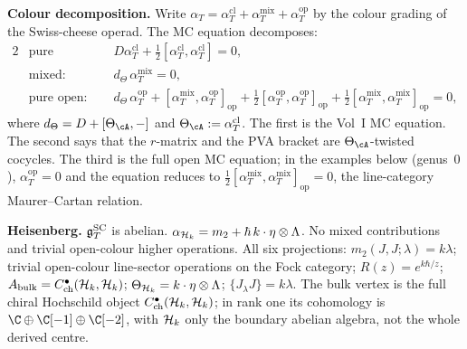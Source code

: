 \medskip
\noindent\textbf{Colour decomposition.}\enspace
Write $\alpha_T = \alpha_T^{\mathrm{cl}}
+ \alpha_T^{\mathrm{mix}} + \alpha_T^{\mathrm{op}}$
by the colour grading of the Swiss-cheese operad. The
MC equation decomposes:
\begin{alignat*}{2}
&\text{pure closed:}\quad
&&D\alpha_T^{\mathrm{cl}}
 + \tfrac{1}{2}[\alpha_T^{\mathrm{cl}},
 \alpha_T^{\mathrm{cl}}] = 0, \\
&\text{mixed:}\quad
&&d_{\Theta}\,\alpha_T^{\mathrm{mix}} = 0, \\
&\text{pure open:}\quad
&&d_{\Theta}\,\alpha_T^{\mathrm{op}}
 + [\alpha_T^{\mathrm{mix}},
 \alpha_T^{\mathrm{op}}]_{\mathrm{op}}
 + \tfrac{1}{2}[\alpha_T^{\mathrm{op}},
 \alpha_T^{\mathrm{op}}]_{\mathrm{op}}
 + \tfrac{1}{2}[\alpha_T^{\mathrm{mix}},
 \alpha_T^{\mathrm{mix}}]_{\mathrm{op}} = 0,
\end{alignat*}
where $d_\Theta = D + [\Theta_\cA, -]$ and
$\Theta_\cA := \alpha_T^{\mathrm{cl}}$. The first is the Vol~I
MC equation. The second says that the $r$-matrix and the PVA
bracket are $\Theta_\cA$-twisted cocycles. The third is the full
open MC equation; in the examples below (genus~$0$), $\alpha_T^{\mathrm{op}} = 0$
and the equation reduces to $\tfrac{1}{2}[\alpha_T^{\mathrm{mix}},
\alpha_T^{\mathrm{mix}}]_{\mathrm{op}} = 0$, the line-category
Maurer--Cartan relation.

\medskip
\noindent\textbf{Heisenberg.}\enspace
$\mathfrak{g}^{\mathrm{SC}}_T$ is abelian.
$\alpha_{\mathcal{H}_k} = m_2 + \hbar\,k\cdot\eta\otimes\Lambda$.
No mixed contributions and trivial open-colour higher
operations. All six projections:
$m_2(J,J;\lambda) = k\lambda$;
trivial open-colour line-sector operations on the Fock category;
$R(z) = e^{k\hbar/z}$;
$A_{\mathrm{bulk}} = C^\bullet_{\mathrm{ch}}(\mathcal{H}_k,\mathcal{H}_k)$;
$\Theta_{\mathcal{H}_k} = k\cdot\eta\otimes\Lambda$;
$\{J_\lambda J\} = k\lambda$.
The bulk vertex is the full chiral Hochschild object
$C^\bullet_{\mathrm{ch}}(\mathcal{H}_k,\mathcal{H}_k)$; in rank one its cohomology is
$\C\oplus\C[-1]\oplus\C[-2]$, with $\mathcal{H}_k$ only the boundary
abelian algebra, not the whole derived centre.

